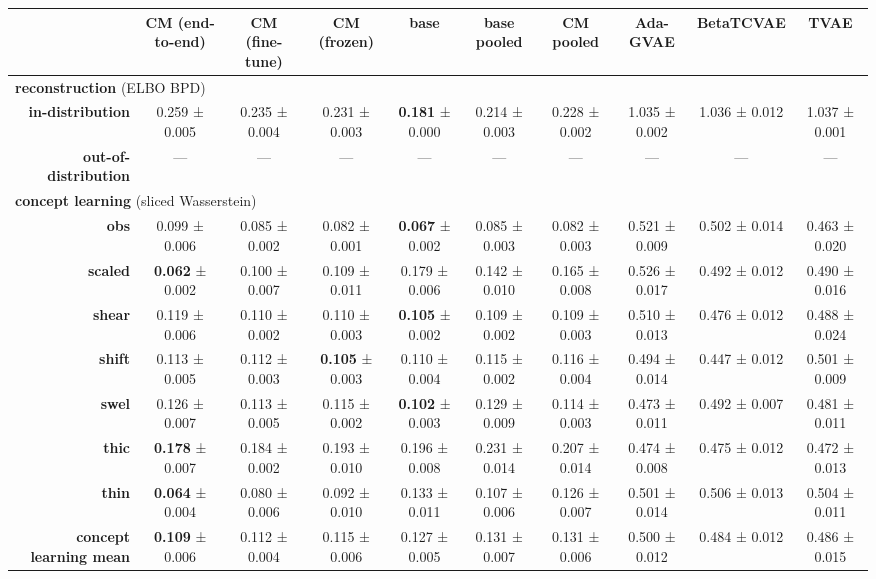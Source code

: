 \begin{tabular}{rccccccccc}
\toprule
& \textbf{CM (end-to-end)} & \textbf{CM (fine-tune)} & \textbf{CM (frozen)} & \textbf{base} & \textbf{base pooled} & \textbf{CM pooled} & \textbf{Ada-GVAE} & \textbf{BetaTCVAE} & \textbf{TVAE} \\
\midrule
\multicolumn{ 10 }{l}{\textbf{reconstruction}  (ELBO BPD)} \\
\midrule
\textbf{in-distribution} & 0.259 ± 0.005 & 0.235 ± 0.004 & 0.231 ± 0.003 & \textbf{0.181} ± 0.000 & 0.214 ± 0.003 & 0.228 ± 0.002 & 1.035 ± 0.002 & 1.036 ± 0.012 & 1.037 ± 0.001 \\
\textbf{out-of-distribution} & --- & --- & --- & --- & --- & --- & --- & --- & --- \\
\midrule
\multicolumn{ 10 }{l}{\textbf{concept learning}  (sliced Wasserstein)} \\
\midrule
\textbf{obs} & 0.099 ± 0.006 & 0.085 ± 0.002 & 0.082 ± 0.001 & \textbf{0.067} ± 0.002 & 0.085 ± 0.003 & 0.082 ± 0.003 & 0.521 ± 0.009 & 0.502 ± 0.014 & 0.463 ± 0.020 \\
\textbf{scaled} & \textbf{0.062} ± 0.002 & 0.100 ± 0.007 & 0.109 ± 0.011 & 0.179 ± 0.006 & 0.142 ± 0.010 & 0.165 ± 0.008 & 0.526 ± 0.017 & 0.492 ± 0.012 & 0.490 ± 0.016 \\
\textbf{shear} & 0.119 ± 0.006 & 0.110 ± 0.002 & 0.110 ± 0.003 & \textbf{0.105} ± 0.002 & 0.109 ± 0.002 & 0.109 ± 0.003 & 0.510 ± 0.013 & 0.476 ± 0.012 & 0.488 ± 0.024 \\
\textbf{shift} & 0.113 ± 0.005 & 0.112 ± 0.003 & \textbf{0.105} ± 0.003 & 0.110 ± 0.004 & 0.115 ± 0.002 & 0.116 ± 0.004 & 0.494 ± 0.014 & 0.447 ± 0.012 & 0.501 ± 0.009 \\
\textbf{swel} & 0.126 ± 0.007 & 0.113 ± 0.005 & 0.115 ± 0.002 & \textbf{0.102} ± 0.003 & 0.129 ± 0.009 & 0.114 ± 0.003 & 0.473 ± 0.011 & 0.492 ± 0.007 & 0.481 ± 0.011 \\
\textbf{thic} & \textbf{0.178} ± 0.007 & 0.184 ± 0.002 & 0.193 ± 0.010 & 0.196 ± 0.008 & 0.231 ± 0.014 & 0.207 ± 0.014 & 0.474 ± 0.008 & 0.475 ± 0.012 & 0.472 ± 0.013 \\
\textbf{thin} & \textbf{0.064} ± 0.004 & 0.080 ± 0.006 & 0.092 ± 0.010 & 0.133 ± 0.011 & 0.107 ± 0.006 & 0.126 ± 0.007 & 0.501 ± 0.014 & 0.506 ± 0.013 & 0.504 ± 0.011 \\
\addlinespace
\textbf{concept learning mean} & \textbf{0.109} ± 0.006 & 0.112 ± 0.004 & 0.115 ± 0.006 & 0.127 ± 0.005 & 0.131 ± 0.007 & 0.131 ± 0.006 & 0.500 ± 0.012 & 0.484 ± 0.012 & 0.486 ± 0.015 \\
\midrule
\bottomrule
\end{tabular}